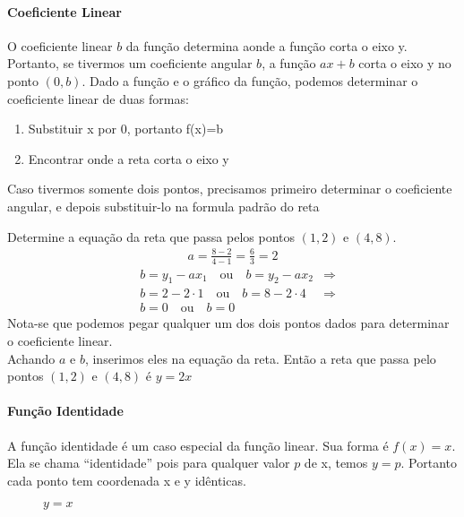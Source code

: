 \paragraph{Coeficiente Linear} O coeficiente linear $b$ da função determina aonde a função corta o eixo y. Portanto, se tivermos um coeficiente angular $b$, a função $ax+b$ corta o eixo y no ponto $(0,b)$. Dado a função e o gráfico da função, podemos determinar o coeficiente linear de duas formas:
\begin{enumerate}
\item Substituir x por 0, portanto f(x)=b
\item Encontrar onde a reta corta o eixo y
\end{enumerate}
Caso tivermos somente dois pontos, precisamos primeiro determinar o coeficiente angular, e depois substituir-lo na formula padrão do reta
\begin{exemplo}
Determine a equação da reta que passa pelos pontos $(1,2)$ e $(4,8)$.
\begin{align*}
&a=\frac{8-2}{4-1}=\frac{6}{3}=2&
\end{align*}
\begin{align*}
&b=y_1 - ax_1 \quad \textrm{ou} \quad b=y_2 - ax_2& \Rightarrow\\
&b=2 - 2\cdot1 \quad \textrm{ou} \quad b=8 - 2\cdot4 &\Rightarrow\\ 
&b=0 \quad \textrm{ou} \quad b=0 &
\end{align*}
Nota-se que podemos pegar qualquer um dos dois pontos dados para determinar o coeficiente linear. \\
Achando $a$ e $b$, inserimos eles na equação da reta. Então a reta que passa pelo pontos $(1,2)$ e $(4,8)$ é $y=2x$
\end{exemplo}
\paragraph{Função Identidade} A função identidade é um caso especial da função linear. Sua forma é $f(x)=x$. Ela se chama ``identidade'' pois para qualquer valor $p$ de x, temos $y=p$. Portanto cada ponto tem coordenada x e y idênticas. 

\begin{figure}[H] 
\centering
    \caption[Função Identidade]{$y=x$}
\end{figure}

